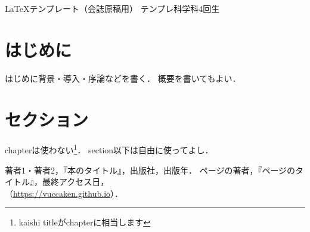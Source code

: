 \documentclass[uplatex,dvipdfmx,10pt,b5paper,papersize]{jsbook}
\begin{document}


\kaishititle%
  {\LaTeX テンプレート（会誌原稿用）}%
  {テンプレ科学科4回生}%
  {}%


\section*{はじめに}
はじめに背景・導入・序論などを書く．
概要を書いてもよい．


\section{セクション}
chapterは使わない\footnote{kaishi titleがchapterに相当します}．
section以下は自由に使ってよし．


\begin{thebibliography}{99}
   著者1・著者2，『本のタイトル』，出版社，出版年．
   ページの著者，『ページのタイトル』，最終アクセス日，\\（\url{https://vuccaken.github.io}）．
\end{thebibliography}
\end{document}

